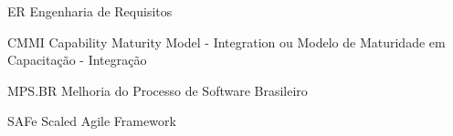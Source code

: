 \begin{siglas}
\item[ER] Engenharia de Requisitos
\item[CMMI] Capability Maturity Model - Integration ou Modelo de Maturidade em Capacitação - Integração
\item[MPS.BR] Melhoria do Processo de Software Brasileiro
\item[SAFe] Scaled Agile Framework
\end{siglas}
